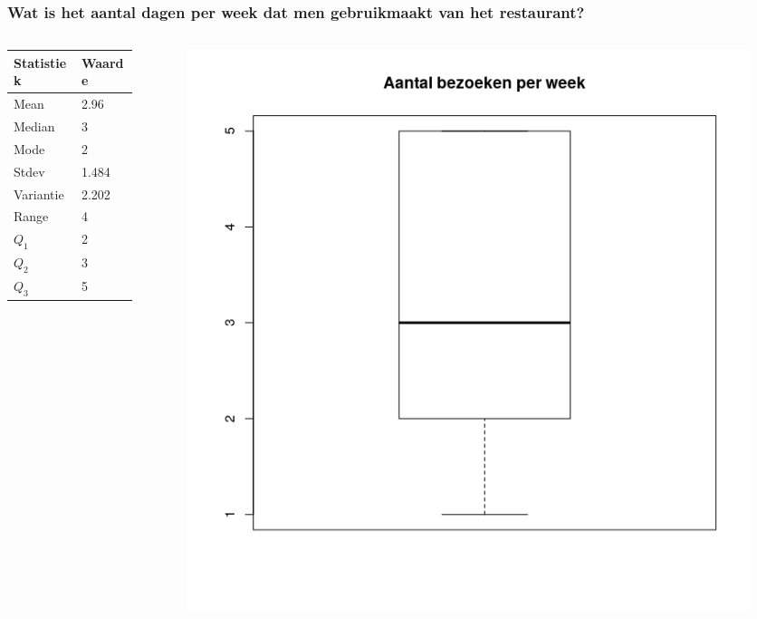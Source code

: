 \documentclass{beamer}
\begin{document}
\begin{frame}
  \frametitle{Wat is het aantal dagen per week dat men gebruikmaakt van het restaurant?}
  \begin{columns}
    \begin{column}{0.5\textwidth}
      \begin{table}[h]
        \begin{tabular}{|l|l|}
          \hline
          { \textbf{Statistiek}} & \textbf{Waarde} \\ \hline
          Mean                   & 2.96            \\ \hline
          Median                 & 3               \\ \hline
          Mode                   & 2               \\ \hline
          Stdev                  & 1.484           \\ \hline
          Variantie              & 2.202           \\ \hline
          Range                  & 4               \\ \hline
          $Q_{1}$                & 2               \\ \hline
          $Q_{2}$                & 3               \\ \hline
          $Q_{3}$                & 5               \\ \hline
        \end{tabular}
      \end{table}
    \end{column}
    \begin{column}{0.5\textwidth}

      \begin{figure}
        \centering
        \includegraphics[width=1.00\textwidth]{img/2var-boxplot-aantalbezoeken}
        \label{fig:boxplotStudenten}
      \end{figure}


\end{column}
\end{columns}
\end{frame}
\end{document}

